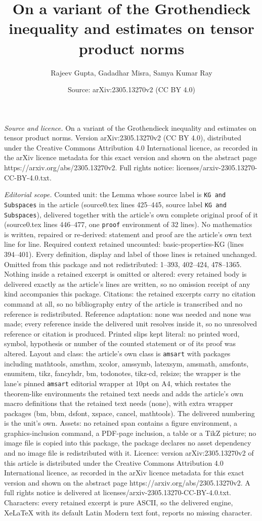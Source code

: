 \documentclass[10pt,a4paper]{amsart}
\title[On a variant of the Grothendieck inequality and estimates on]{On a variant of the Grothendieck inequality and estimates on tensor product norms}
\author{Rajeev Gupta, Gadadhar Misra, Samya Kumar Ray}
\date{Source: arXiv:2305.13270v2 (CC BY 4.0)}
\begin{document}
\maketitle

\noindent\emph{Source and licence.} On a variant of the Grothendieck inequality and estimates on tensor product norms. Version arXiv:2305.13270v2 (CC BY 4.0), distributed under the Creative Commons Attribution 4.0 International licence, as recorded in the arXiv licence metadata for this exact version and shown on the abstract page https://arxiv.org/abs/2305.13270v2. Full rights notice: licenses/arxiv-2305.13270-CC-BY-4.0.txt.\par\smallskip

\noindent\textit{Editorial scope.} Counted unit: the Lemma whose source label is \texttt{KG and Subspaces} in the article (source0.tex lines 425--445, source label \texttt{KG and Subspaces}), delivered together with the article's own complete original proof of it (source0.tex lines 446--477, one \texttt{proof} environment of 32 lines). No mathematics is written, repaired or re-derived: statement and proof are the article's own text line for line. Required context retained uncounted: basic-properties-KG (lines 394--401). Every definition, display and label of those lines is retained unchanged. Omitted from this package and not redistributed: 1--393, 402--424, 478--1365. Nothing inside a retained excerpt is omitted or altered: every retained body is delivered exactly as the article's lines are written, so no omission receipt of any kind accompanies this package. Citations: the retained excerpts carry no citation command at all, so no bibliography entry of the article is transcribed and no reference is redistributed. Reference adaptation: none was needed and none was made; every reference inside the delivered unit resolves inside it, so no unresolved reference or citation is produced. Printed slips kept literal: no printed word, symbol, hypothesis or number of the counted statement or of its proof was altered. Layout and class: the article's own class is \texttt{amsart} with packages including mathtools, amsthm, xcolor, amssymb, latexsym, amsmath, amsfonts, enumitem, tikz, fancyhdr, bm, todonotes, tikz-cd, relsize; the wrapper is the lane's pinned \texttt{amsart} editorial wrapper at 10pt on A4, which restates the theorem-like environments the retained text needs and adds the article's own macro definitions that the retained text needs (none), with extra wrapper packages (bm, bbm, dsfont, xspace, cancel, mathtools). The delivered numbering is the unit's own. Assets: no retained span contains a figure environment, a graphics-inclusion command, a PDF-page inclusion, a table or a TikZ picture; no image file is copied into this package, the package declares no asset dependency and no image file is redistributed with it. Licence: version arXiv:2305.13270v2 of this article is distributed under the Creative Commons Attribution 4.0 International licence, as recorded in the arXiv licence metadata for this exact version and shown on the abstract page https://arxiv.org/abs/2305.13270v2. A full rights notice is delivered at licenses/arxiv-2305.13270-CC-BY-4.0.txt. Characters: every retained excerpt is pure ASCII, so the delivered engine, XeLaTeX with its default Latin Modern text font, reports no missing character.
\end{document}
